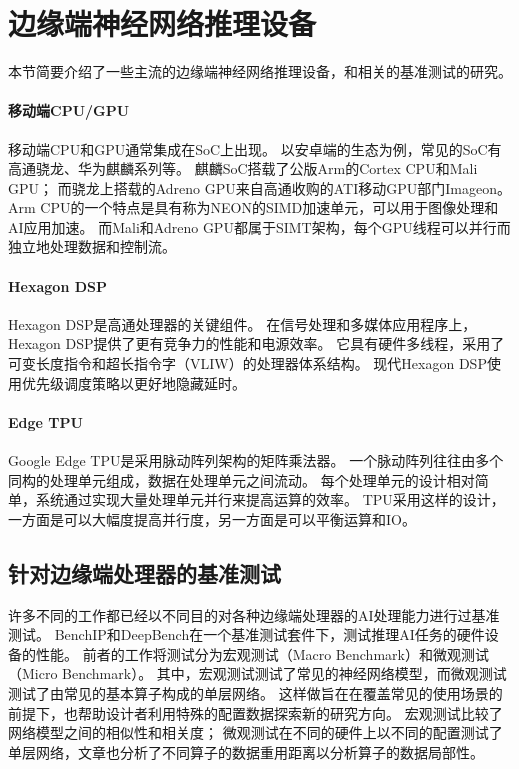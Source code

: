 \section{边缘端神经网络推理设备}
本节简要介绍了一些主流的边缘端神经网络推理设备，和相关的基准测试的研究。

\paragraph{移动端CPU/GPU}
移动端CPU和GPU通常集成在SoC上出现。
以安卓端的生态为例，常见的SoC有高通骁龙、华为麒麟系列等。
麒麟SoC搭载了公版Arm的Cortex CPU和Mali GPU；
而骁龙上搭载的Adreno GPU来自高通收购的ATI移动GPU部门Imageon。
Arm CPU的一个特点是具有称为NEON的SIMD加速单元，可以用于图像处理和AI应用加速。
而Mali和Adreno GPU都属于SIMT架构，每个GPU线程可以并行而独立地处理数据和控制流。

\paragraph{Hexagon DSP}
Hexagon DSP是高通处理器的关键组件。
在信号处理和多媒体应用程序上，Hexagon DSP提供了更有竞争力的性能和电源效率。
它具有硬件多线程，采用了可变长度指令和超长指令字（VLIW）的处理器体系结构。
现代Hexagon DSP使用优先级调度策略以更好地隐藏延时。

\paragraph{Edge TPU}
Google Edge TPU是采用脉动阵列架构的矩阵乘法器。
一个脉动阵列往往由多个同构的处理单元组成，数据在处理单元之间流动。
每个处理单元的设计相对简单，系统通过实现大量处理单元并行来提高运算的效率。
TPU采用这样的设计，一方面是可以大幅度提高并行度，另一方面是可以平衡运算和IO。

\subsection{针对边缘端处理器的基准测试}
许多不同的工作都已经以不同目的对各种边缘端处理器的AI处理能力进行过基准测试。
BenchIP\cite{tao2017benchip}和DeepBench\cite{deepbench}在一个基准测试套件下，测试推理AI任务的硬件设备的性能。
前者的工作将测试分为宏观测试（Macro Benchmark）和微观测试（Micro Benchmark）。
其中，宏观测试测试了常见的神经网络模型，而微观测试测试了由常见的基本算子构成的单层网络。
这样做旨在在覆盖常见的使用场景的前提下，也帮助设计者利用特殊的配置数据探索新的研究方向。
宏观测试比较了网络模型之间的相似性和相关度；
微观测试在不同的硬件上以不同的配置测试了单层网络，文章也分析了不同算子的数据重用距离以分析算子的数据局部性。
